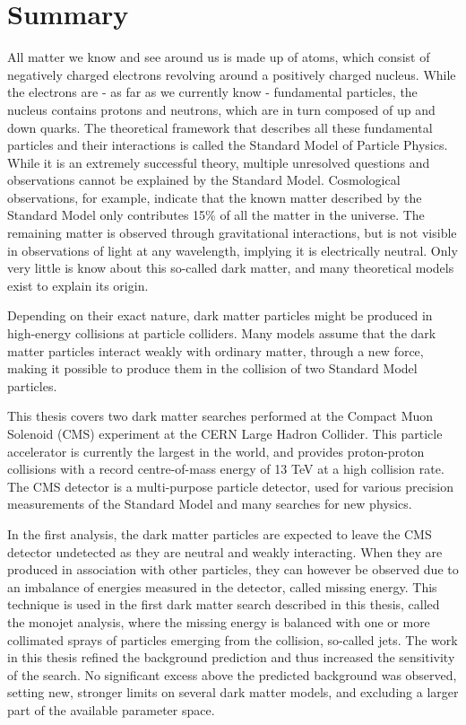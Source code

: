 
\chapter*{Summary}

All matter we know and see around us is made up of atoms, which consist of negatively charged electrons revolving around a positively charged nucleus. While the electrons are - as far as we currently know - fundamental particles, the nucleus contains protons and neutrons, which are in turn composed of up and down quarks. The theoretical framework that describes all these fundamental particles and their interactions is called the Standard Model of Particle Physics.  While it is an extremely successful theory, multiple unresolved questions and observations cannot be explained by the Standard Model. Cosmological observations, for example, indicate that the known matter described by the Standard Model only contributes 15\% of all the matter in the universe. The remaining matter is observed through gravitational interactions, but is not visible in observations of light at any wavelength, implying it is electrically neutral. Only very little is know about this so-called dark matter, and many theoretical models exist to explain its origin.

Depending on their exact nature, dark matter particles might be produced in high-energy collisions at particle colliders. Many models assume that the dark matter particles interact weakly with ordinary matter, through a new force, making it possible to produce them in the collision of two Standard Model particles. 

This thesis covers two dark matter searches performed at the Compact Muon Solenoid (CMS) experiment at the CERN Large Hadron Collider. This particle accelerator is currently the largest in the world, and provides proton-proton collisions with a record centre-of-mass energy of 13 TeV at a high collision rate. The CMS detector is a multi-purpose particle detector, used for various precision measurements of the Standard Model and many searches for new physics.

In the first analysis, the dark matter particles are expected to leave the CMS detector undetected as they are neutral and weakly interacting. When they are produced in association with other particles, they can however be observed due to an imbalance of energies measured in the detector, called missing energy. This technique is used in the first dark matter search described in this thesis, called the monojet analysis, where the missing energy is balanced with one or more collimated sprays of particles emerging from the collision, so-called jets. The work in this thesis refined the background prediction and thus increased the sensitivity of the search. No significant excess above the predicted background was observed, setting new, stronger limits on several dark matter models, and excluding a larger part of the available parameter space.

